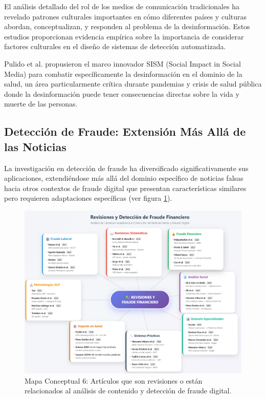 El análisis detallado del rol de los medios de comunicación tradicionales \cite{carcamo2021fake, perez2020fake} ha revelado patrones culturales importantes en cómo diferentes países y culturas abordan, conceptualizan, y responden al problema de la desinformación. Estos estudios proporcionan evidencia empírica sobre la importancia de considerar factores culturales en el diseño de sistemas de detección automatizada.

Pulido et al. \cite{pulido2020new} propusieron el marco innovador SISM (Social Impact in Social Media) para combatir específicamente la desinformación en el dominio de la salud, un área particularmente crítica durante pandemias y crisis de salud pública donde la desinformación puede tener consecuencias directas sobre la vida y muerte de las personas.

\subsection{Detección de Fraude: Extensión Más Allá de las Noticias}

La investigación en detección de fraude ha diversificado significativamente sus aplicaciones, extendiéndose más allá del dominio específico de noticias falsas hacia otros contextos de fraude digital que presentan características similares pero requieren adaptaciones específicas (ver figura \ref{fig:mapa_conceptual_6}).

\begin{figure}[h!]
    \centering
    \includegraphics[width=\textwidth]{Imagenes/mapaConceptual6.png}
    \caption{Mapa Conceptual 6: Artículos que son revisiones o están relacionados al análisis de contenido y detección de fraude digital.}
    \label{fig:mapa_conceptual_6}
\end{figure}

